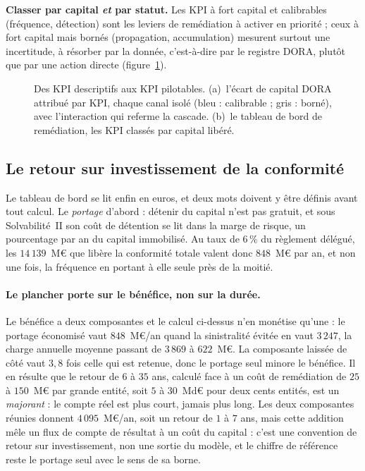 \begin{cle}
\textbf{Classer par capital \emph{et} par statut.} Les KPI à fort capital et calibrables
(fréquence, détection) sont les leviers de remédiation à activer en priorité ; ceux à fort capital
mais bornés (propagation, accumulation) mesurent surtout une incertitude, à résorber par la donnée,
c'est-à-dire par le registre DORA, plutôt que par une action directe (figure~\ref{fig:kpi}).
\end{cle}

\begin{figure}[htbp]\centering
{}
\caption{Des KPI descriptifs aux KPI pilotables. (a)~l'écart de capital DORA attribué par KPI,
chaque canal isolé (bleu : calibrable ; gris : borné), avec l'interaction qui referme la
cascade. (b)~le tableau de bord de remédiation, les KPI classés par capital libéré.}
\label{fig:kpi}
\end{figure}

\subsection{Le retour sur investissement de la conformité}
\label{sec:roi}

Le tableau de bord se lit enfin en euros, et deux mots doivent y être définis avant tout calcul.
Le \emph{portage} d'abord : détenir du capital n'est pas gratuit, et sous Solvabilité~II son coût
de détention se lit dans la marge de risque, un pourcentage par an du capital immobilisé. Au taux
de $6\,\%$ du règlement délégué, les $14\,139$~M\euro{} que libère la conformité totale valent donc
$848$~M\euro{} par an, et non une fois, la fréquence en portant à elle seule près de la moitié.

\paragraph{Le plancher porte sur le bénéfice, non sur la durée.} Le bénéfice a deux composantes et
le calcul ci-dessus n'en monétise qu'une : le portage économisé vaut $848$~M\euro/an quand la
sinistralité évitée en vaut $3\,247$, la charge annuelle moyenne passant de $3\,869$ à
$622$~M\euro. La composante laissée de côté vaut $3{,}8$ fois celle qui est retenue, donc le
portage seul minore le bénéfice. Il en résulte que le retour de $6$ à $35$ ans, calculé face à un
coût de remédiation de $25$ à $150$~M\euro{} par grande entité, soit $5$ à $30$~Md\euro{} pour deux
cents entités, est un \emph{majorant} : le compte réel est plus court, jamais plus long. Les deux
composantes réunies donnent $4\,095$~M\euro/an, soit un retour de $1$ à $7$ ans, mais cette
addition mêle un flux de compte de résultat à un coût du capital : c'est une convention de retour
sur investissement, non une sortie du modèle, et le chiffre de référence reste le portage seul avec
le sens de sa borne.


